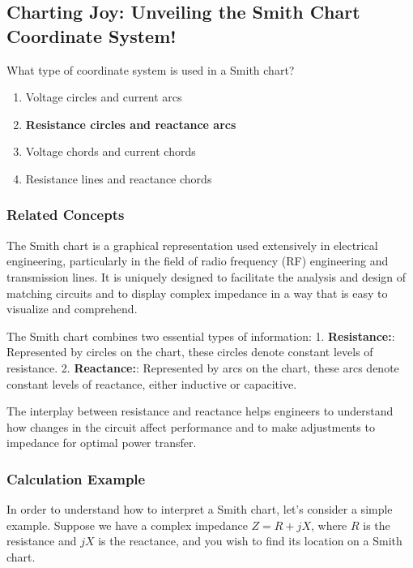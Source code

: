 \subsection{Charting Joy: Unveiling the Smith Chart Coordinate System!}

\begin{tcolorbox}[colback=gray!10, colframe=black, title=E9G02] What type of coordinate system is used in a Smith chart?
\begin{enumerate}[label=\Alph*.]
    \item Voltage circles and current arcs
    \item \textbf{Resistance circles and reactance arcs}
    \item Voltage chords and current chords
    \item Resistance lines and reactance chords
\end{enumerate} \end{tcolorbox}

\subsubsection{Related Concepts}

The Smith chart is a graphical representation used extensively in electrical engineering, particularly in the field of radio frequency (RF) engineering and transmission lines. It is uniquely designed to facilitate the analysis and design of matching circuits and to display complex impedance in a way that is easy to visualize and comprehend.

The Smith chart combines two essential types of information:
1. \textbf{Resistance:}: Represented by circles on the chart, these circles denote constant levels of resistance. 
2. \textbf{Reactance:}: Represented by arcs on the chart, these arcs denote constant levels of reactance, either inductive or capacitive.

The interplay between resistance and reactance helps engineers to understand how changes in the circuit affect performance and to make adjustments to impedance for optimal power transfer.

\subsubsection{Calculation Example}

In order to understand how to interpret a Smith chart, let’s consider a simple example. Suppose we have a complex impedance \( Z = R + jX \), where \( R \) is the resistance and \( jX \) is the reactance, and you wish to find its location on a Smith chart.

